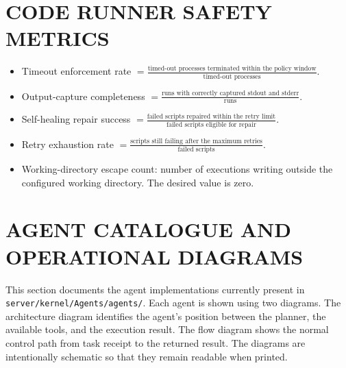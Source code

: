 \section{\uppercase{Code Runner Safety Metrics}}
\begin{itemize}
\item Timeout enforcement rate $=\frac{\text{timed-out processes terminated within the policy window}}{\text{timed-out processes}}$.
\item Output-capture completeness $=\frac{\text{runs with correctly captured stdout and stderr}}{\text{runs}}$.
\item Self-healing repair success $=\frac{\text{failed scripts repaired within the retry limit}}{\text{failed scripts eligible for repair}}$.
\item Retry exhaustion rate $=\frac{\text{scripts still failing after the maximum retries}}{\text{failed scripts}}$.
\item Working-directory escape count: number of executions writing outside the configured working directory. The desired value is zero.
\end{itemize}

\iffalse
\clearpage
\section{\uppercase{Agent Catalogue and Operational Diagrams}}

This section documents the agent implementations currently present in
\texttt{server/kernel/Agents/agents/}. Each agent is shown using two diagrams.
The architecture diagram identifies the agent's position between the planner,
the available tools, and the execution result. The flow diagram shows the
normal control path from task receipt to the returned result. The diagrams are
intentionally schematic so that they remain readable when printed.

